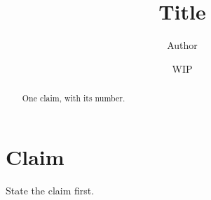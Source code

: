 \documentclass[11pt]{article}
\title{Title}
\author{Author}
\date{WIP}
\begin{document}
\maketitle
\begin{abstract}
One claim, with its number.
\end{abstract}

\section{Claim}
\label{sec:claim}
State the claim first.

\printbibliography
\end{document}
